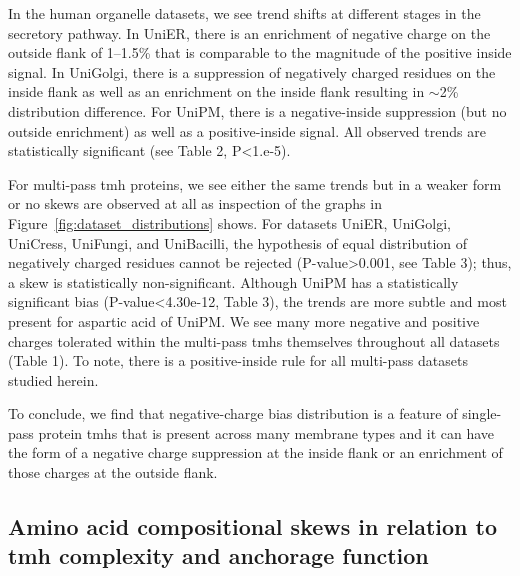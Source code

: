 In the human organelle datasets, we see trend shifts at different stages in the secretory pathway. In UniER, there is an enrichment of negative charge on the outside flank of 1--1.5\% that is comparable to the magnitude of the positive inside signal. In UniGolgi, there is a suppression of negatively charged residues on the inside flank as well as an enrichment on the inside flank resulting in \(\sim\)2\% distribution difference. For UniPM, there is a negative-inside suppression (but no outside enrichment) as well as a positive-inside signal. All observed trends are statistically significant (see Table 2, P<1.e-5).

For multi-pass \gls{tmh} proteins, we see either the same trends but in a weaker form or no skews are observed at all as inspection of the graphs in Figure~\ref{fig:dataset_distributions} shows. For datasets UniER, UniGolgi, UniCress, UniFungi, and UniBacilli, the hypothesis of equal distribution of negatively charged residues cannot be rejected (P-value>0.001, see Table 3); thus, a skew is statistically non-significant. Although UniPM has a statistically significant bias (P-value<4.30e-12, Table 3), the trends are more subtle and most present for aspartic acid of UniPM\@. We see many more negative and positive charges tolerated within the multi-pass \gls{tmh}s themselves throughout all datasets (Table 1). To note, there is a positive-inside rule for all multi-pass datasets studied herein.

To conclude, we find that negative-charge bias distribution is a feature of single-pass protein \gls{tmh}s that is present across many membrane types and it can have the form of a negative charge suppression at the inside flank or an enrichment of those charges at the outside flank.

\subsection{Amino acid compositional skews in relation to \gls{tmh} complexity and anchorage function}

